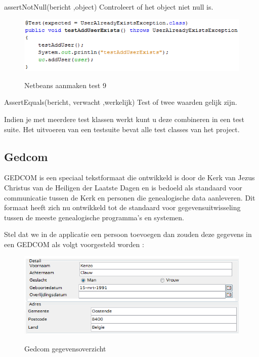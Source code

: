 \documentclass[pdftex,a4paper,12pt,twoside]{report}
\begin{document}
assertNotNull(bericht ,object)
Controleert of het object niet null is.

\begin{figure}[!htb]
\includegraphics{images/junit3.png}\\
\caption{Netbeans aanmaken test 9}
\end{figure}

AssertEquals(bericht, verwacht ,werkelijk)
Test of twee waarden gelijk zijn.

Indien je met meerdere test klassen werkt kunt u deze combineren in een test suite.
Het uitvoeren van een testsuite bevat alle test classes van het project.




\subsection{Gedcom}

GEDCOM is een speciaal tekstformaat die ontwikkeld is door de Kerk van Jezus Christus van de Heiligen der Laatste Dagen en is bedoeld als standaard voor communicatie tussen de Kerk en personen die genealogische data aanleveren.
Dit formaat heeft zich nu ontwikkeld tot de standaard voor gegevensuitwisseling tussen de meeste genealogische programma's en systemen.

Stel dat we in de applicatie een persoon toevoegen dan zouden deze gegevens in een GEDCOM als volgt voorgesteld worden :

\begin{figure}[!htb]
\includegraphics{images/gedcom.png}\\
\caption{Gedcom gegevensoverzicht}
\end{figure}
\end{document}
